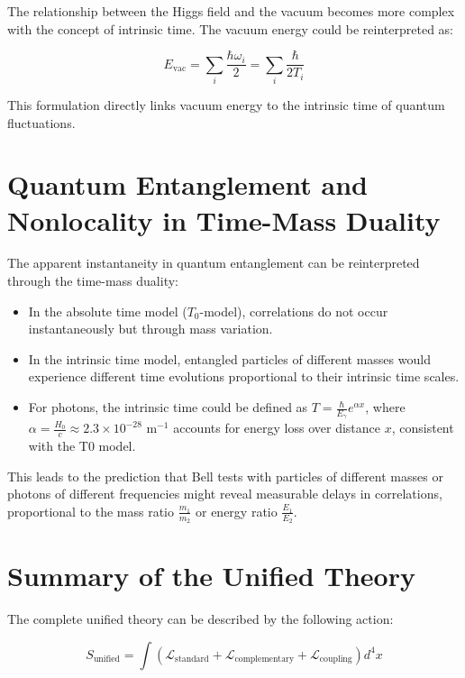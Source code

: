 \documentclass{article}
\begin{document}
The relationship between the Higgs field and the vacuum becomes more complex with the concept of intrinsic time. The vacuum energy could be reinterpreted as:

\begin{equation}
	E_\text{vac} = \sum_i \frac{\hbar \omega_i}{2} = \sum_i \frac{\hbar}{2T_i}
\end{equation}

This formulation directly links vacuum energy to the intrinsic time of quantum fluctuations.

\section{Quantum Entanglement and Nonlocality in Time-Mass Duality}

The apparent instantaneity in quantum entanglement can be reinterpreted through the time-mass duality:

\begin{itemize}
	\item In the absolute time model (\(T_0\)-model), correlations do not occur instantaneously but through mass variation.
	\item In the intrinsic time model, entangled particles of different masses would experience different time evolutions proportional to their intrinsic time scales.
	\item For photons, the intrinsic time could be defined as \(T = \frac{\hbar}{E_{\gamma}} e^{\alpha x}\), where \(\alpha = \frac{H_0}{c} \approx 2.3 \times 10^{-28} \text{ m}^{-1}\) accounts for energy loss over distance \(x\), consistent with the T0 model.
\end{itemize}

This leads to the prediction that Bell tests with particles of different masses or photons of different frequencies might reveal measurable delays in correlations, proportional to the mass ratio \(\frac{m_1}{m_2}\) or energy ratio \(\frac{E_1}{E_2}\).

\section{Summary of the Unified Theory}

The complete unified theory can be described by the following action:

\begin{equation}
	S_\text{unified} = \int \left( \mathcal{L}_\text{standard} + \mathcal{L}_\text{complementary} + \mathcal{L}_\text{coupling} \right) d^4x
\end{equation}
\end{document}
